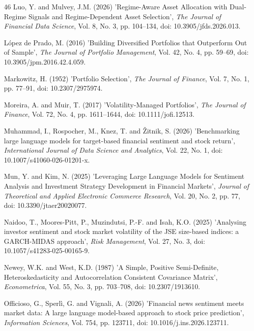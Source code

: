 \documentclass{singlecol-new}
\theoremstyle{TH}{
\newtheorem{lemma}{Lemma}
\newtheorem{theorem}[lemma]{Theorem}
\newtheorem{corrolary}[lemma]{Corrolary}
\newtheorem{conjecture}[lemma]{Conjecture}
\newtheorem{proposition}[lemma]{Proposition}
\newtheorem{claim}[lemma]{Claim}
\newtheorem{stheorem}[lemma]{Wrong Theorem}
\newtheorem{algorithm}{Algorithm}
}
\theoremstyle{THrm}{
\newtheorem{definition}{Definition}[section]
\newtheorem{question}{Question}[section]
\newtheorem{remark}{Remark}
\newtheorem{scheme}{Scheme}
}
\theoremstyle{THhit}{
\newtheorem{case}{Case}[section]
}
\begin{document}
\begin{thebibliography}{46}
Luo, Y. and Mulvey, J.M. (2026) 'Regime-Aware Asset Allocation with Dual-Regime Signals and Regime-Dependent Asset Selection', {\it The Journal of Financial Data Science}, Vol. 8, No. 3, pp. 104--134, doi: 10.3905/jfds.2026.013.

López de Prado, M. (2016) 'Building Diversified Portfolios that Outperform Out of Sample', {\it The Journal of Portfolio Management}, Vol. 42, No. 4, pp. 59--69, doi: 10.3905/jpm.2016.42.4.059.

Markowitz, H. (1952) 'Portfolio Selection', {\it The Journal of Finance}, Vol. 7, No. 1, pp. 77--91, doi: 10.2307/2975974.

Moreira, A. and Muir, T. (2017) 'Volatility‐Managed Portfolios', {\it The Journal of Finance}, Vol. 72, No. 4, pp. 1611--1644, doi: 10.1111/jofi.12513.

Muhammad, I., Rospocher, M., Knez, T. and Žitnik, S. (2026) 'Benchmarking large language models for target-based financial sentiment and stock return', {\it International Journal of Data Science and Analytics}, Vol. 22, No. 1, doi: 10.1007/s41060-026-01201-x.

Mun, Y. and Kim, N. (2025) 'Leveraging Large Language Models for Sentiment Analysis and Investment Strategy Development in Financial Markets', {\it Journal of Theoretical and Applied Electronic Commerce Research}, Vol. 20, No. 2, pp. 77, doi: 10.3390/jtaer20020077.

Naidoo, T., Moores-Pitt, P., Muzindutsi, P.-F. and Isah, K.O. (2025) 'Analysing investor sentiment and stock market volatility of the JSE size-based indices: a GARCH-MIDAS approach', {\it Risk Management}, Vol. 27, No. 3, doi: 10.1057/s41283-025-00165-9.

Newey, W.K. and West, K.D. (1987) 'A Simple, Positive Semi-Definite, Heteroskedasticity and Autocorrelation Consistent Covariance Matrix', {\it Econometrica}, Vol. 55, No. 3, pp. 703--708, doi: 10.2307/1913610.

Officioso, G., Sperlì, G. and Vignali, A. (2026) 'Financial news sentiment meets market data: A large language model-based approach to stock price prediction', {\it Information Sciences}, Vol. 754, pp. 123711, doi: 10.1016/j.ins.2026.123711.


\end{thebibliography}
\end{document}
